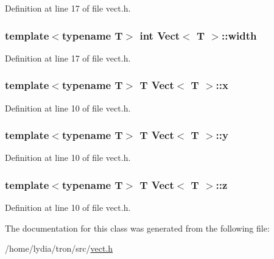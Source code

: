 Definition at line 17 of file vect.\+h.

\hypertarget{class_vect_afb888639716c23ebbe6766d2c6caa673}{
\subsubsection[{width}]{\setlength{\rightskip}{0pt plus 5cm}template$<$typename T$>$ int {\bf Vect}$<$ T $>$\+::width}}\label{class_vect_afb888639716c23ebbe6766d2c6caa673}


Definition at line 17 of file vect.\+h.

\hypertarget{class_vect_aaae8e033fd8c09bc939e1b2d112cd08a}{
\subsubsection[{x}]{\setlength{\rightskip}{0pt plus 5cm}template$<$typename T$>$ T {\bf Vect}$<$ T $>$\+::x}}\label{class_vect_aaae8e033fd8c09bc939e1b2d112cd08a}


Definition at line 10 of file vect.\+h.

\hypertarget{class_vect_ae473746fe9f1385d10e6ae33d3c23b33}{
\subsubsection[{y}]{\setlength{\rightskip}{0pt plus 5cm}template$<$typename T$>$ T {\bf Vect}$<$ T $>$\+::y}}\label{class_vect_ae473746fe9f1385d10e6ae33d3c23b33}


Definition at line 10 of file vect.\+h.

\hypertarget{class_vect_a4671ff0667271bb36b96798fadba9e08}{
\subsubsection[{z}]{\setlength{\rightskip}{0pt plus 5cm}template$<$typename T$>$ T {\bf Vect}$<$ T $>$\+::z}}\label{class_vect_a4671ff0667271bb36b96798fadba9e08}


Definition at line 10 of file vect.\+h.



The documentation for this class was generated from the following file\+:\begin{DoxyCompactItemize}
\item 
/home/lydia/tron/src/\hyperlink{vect_8h}{vect.\+h}\end{DoxyCompactItemize}
